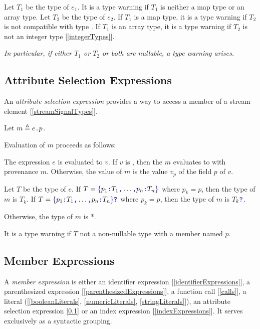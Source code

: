 \documentclass{article}
\begin{document}
Let $T_1$ be the type of $e_1$. It is a type warning if $T_1$ is neither a map type or an array type.
Let $T_2$ be the type of $e_2$. If $T_1$ is a map type, it is a type warning if $T_2$ is not compatible with type \STRING. If $T_1$ is an array type, it is a type warning if $T_2$ is not an integer type [\ref{integerTypes}].

{\em In particular, if  either $T_1$ or $T_2$ or both are nullable, a type warning arises.}


\subsection{Attribute Selection Expressions}
\label{attributeSelectionExpressions}

An {\em attribute selection expression} provides a way to access a member of a stream element [\ref{streamSignalTypes}].

\AttributeSelectionExpression
Let $m \triangleq e\texttt{\color{blue} .}{}p$.

Evaluation of $m$ proceeds as follows:

The expression $e$ is evaluated to $v$.  If $v$ is \NULL{}, then the $m$ evaluates to \NULL{} with provenance $m$. Otherwise, the value of $m$ is the value $v_p$ of the field $p$ of $v$.

Let $T$ be the type of $e$. If $T = \texttt{\color{blue} $\{$}{}p_1\texttt{\color{blue} :}{} T_1\texttt{\color{blue} ,}{} \ldots\texttt{\color{blue} ,}{} p_n\texttt{\color{blue} :}{} T_n\texttt{\color{blue} $\}$}$ where $p_k = p$, then the type of $m$ is $T_k$. If $T = \texttt{\color{blue} $\{$}{}p_1\texttt{\color{blue} :}{} T_1\texttt{\color{blue} ,}{} \ldots\texttt{\color{blue} ,}{} p_n\texttt{\color{blue} :}{} T_n\texttt{\color{blue} $\}$}\texttt{\color{blue} ?}$ where $p_k = p$, then the type of $m$ is $T_k\texttt{\color{blue} ?}$. 

Otherwise, the type of $m$ is *. 

It is a type warning if $T$ not a non-nullable type with a member named $p$. 


\subsection{\space Member Expressions}
\label{memberExpression}

A {\em member expression} is either an identifier expression [\ref{identifierExpressions}], a parenthesized expression [\ref{parenthesizedExpressions}], a function call [\ref{calls}], a literal ([\ref{booleanLiterals}, \ref{numericLiterals}, \ref{stringLiterals}]),  an attribute selection expression [\ref{attributeSelectionExpressions}] or an index expression [\ref{indexExpressions}]. It serves exclusively as a syntactic grouping.
\end{document}
